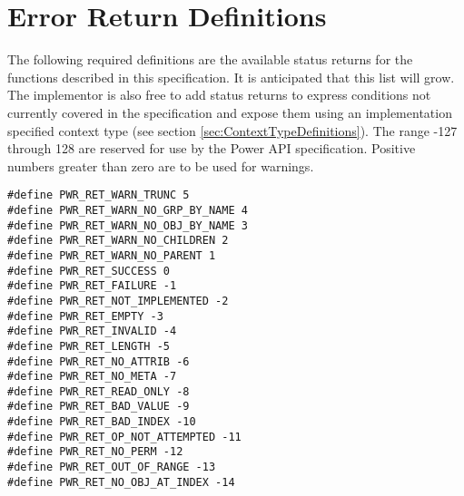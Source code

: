 
\section{Error Return Definitions}\label{sec:ErrorReturnDefinitions}

The following required definitions are the available status returns for the functions described in this specification. 
It is anticipated that this list will grow. 
The implementor is also free to add status returns to express conditions not currently covered in the specification and expose them using an implementation specified context type (see section \ref{sec:ContextTypeDefinitions}).
The range -127 through 128 are reserved for use by the Power API specification.
Positive numbers greater than zero are to be used for warnings.


\begin{center}
\begin{minipage}{.95\linewidth}%
\begin{lstlisting}
#define PWR_RET_WARN_TRUNC 5
#define PWR_RET_WARN_NO_GRP_BY_NAME 4
#define PWR_RET_WARN_NO_OBJ_BY_NAME 3
#define PWR_RET_WARN_NO_CHILDREN 2
#define PWR_RET_WARN_NO_PARENT 1
#define PWR_RET_SUCCESS 0
#define PWR_RET_FAILURE -1
#define PWR_RET_NOT_IMPLEMENTED -2
#define PWR_RET_EMPTY -3
#define PWR_RET_INVALID -4
#define PWR_RET_LENGTH -5
#define PWR_RET_NO_ATTRIB -6
#define PWR_RET_NO_META -7
#define PWR_RET_READ_ONLY -8
#define PWR_RET_BAD_VALUE -9
#define PWR_RET_BAD_INDEX -10
#define PWR_RET_OP_NOT_ATTEMPTED -11
#define PWR_RET_NO_PERM -12
#define PWR_RET_OUT_OF_RANGE -13
#define PWR_RET_NO_OBJ_AT_INDEX -14
\end{lstlisting}
\end{minipage}
\end{center}


